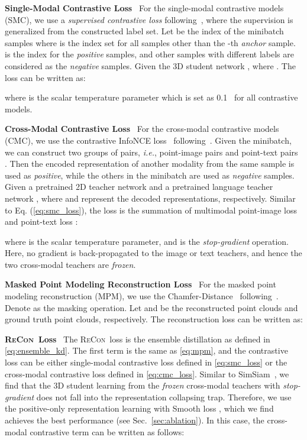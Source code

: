 \documentclass{article}
\theoremstyle{plain}
\theoremstyle{definition}
\theoremstyle{remark}
\def\ie{{\it{i.e.}}}
\def\recon{{\scshape ReCon}}
\begin{document}
\textbf{Single-Modal Contrastive Loss}~
For the single-modal contrastive models (SMC), we use a \textit{supervised contrastive loss} following~\citet{SCL20}, where the supervision is generalized from the constructed label set.
Let  be the index of the minibatch samples where  is the index set for all samples other than the -th \textit{anchor} sample.  is the index for the \textit{positive} samples, and other samples with different labels are considered as the \textit{negative} samples.
Given the 3D student network , where .
The loss  can be written as:

where  is the scalar temperature parameter which is set as 0.1~\citep{SCL20} for all contrastive models.

\textbf{Cross-Modal Contrastive Loss}~
For the cross-modal contrastive models (CMC), we use the contrastive InfoNCE loss~\citep{InfoNCE} following~\citet{CLIP}.
Given the minibatch, we can construct two groups of  pairs, \ie, point-image pairs  and point-text pairs .
Then the encoded representation of another modality from the same sample is used as \textit{positive}, while the others in the minibatch are used as \textit{negative} samples. 
Given a pretrained 2D teacher network  and a pretrained language teacher network , where  and  represent the decoded representations, respectively.
Similar to Eq. (\ref{eq:smc_loss}), the loss  is the summation of multimodal point-image loss  and point-text loss :

where  is the scalar temperature parameter, and  is the \textit{stop-gradient} operation. Here, no gradient is back-propagated to the image or text teachers, and hence the two cross-modal teachers are \textit{frozen}.

\textbf{Masked Point Modeling Reconstruction Loss}~
For the masked point modeling reconstruction (MPM), we use the  Chamfer-Distance~\citep{ChamferDistance17} following~\citet{PointMAE}.
Denote  as the masking operation. Let  and  be the reconstructed point clouds and ground truth point clouds, respectively. 
The reconstruction loss  can be written as:


\textbf{\recon\ Loss}~
The \recon\ loss is the ensemble distillation as defined in \cref{eq:ensemble_kd}. The first term  is the same as \cref{eq:mpm}, and the contrastive loss can be either single-modal contrastive loss defined in \cref{eq:smc_loss} or the cross-modal contrastive loss defined in \cref{eq:cmc_loss}.
Similar to SimSiam~\citep{SimSiam}, we find that the 3D student learning from the \textit{frozen} cross-modal teachers with \textit{stop-gradient} does not fall into the representation collapsing trap.
Therefore, we use the positive-only representation learning with Smooth  loss , which we find achieves the best performance (see Sec.~\ref{sec:ablation}). In this case, the cross-modal contrastive term  can be written as follows:
\end{document}
